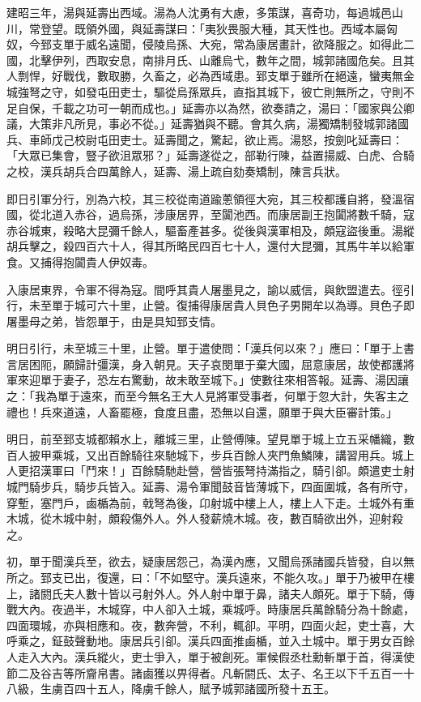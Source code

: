 \begin{pinyinscope}
建昭三年，湯與延壽出西域。湯為人沈勇有大慮，多策謀，喜奇功，每過城邑山川，常登望。既領外國，與延壽謀曰：「夷狄畏服大種，其天性也。西域本屬匈奴，今郅支單于威名遠聞，侵陵烏孫、大宛，常為康居畫計，欲降服之。如得此二國，北擊伊列，西取安息，南排月氏、山離烏弋，數年之間，城郭諸國危矣。且其人剽悍，好戰伐，數取勝，久畜之，必為西域患。郅支單于雖所在絕遠，蠻夷無金城強弩之守，如發屯田吏士，驅從烏孫眾兵，直指其城下，彼亡則無所之，守則不足自保，千載之功可一朝而成也。」延壽亦以為然，欲奏請之，湯曰：「國家與公卿議，大策非凡所見，事必不從。」延壽猶與不聽。會其久病，湯獨矯制發城郭諸國兵、車師戊己校尉屯田吏士。延壽聞之，驚起，欲止焉。湯怒，按劍叱延壽曰：「大眾已集會，豎子欲沮眾邪？」延壽遂從之，部勒行陳，益置揚威、白虎、合騎之校，漢兵胡兵合四萬餘人，延壽、湯上疏自劾奏矯制，陳言兵狀。

即日引軍分行，別為六校，其三校從南道踰蔥領徑大宛，其三校都護自將，發溫宿國，從北道入赤谷，過烏孫，涉康居界，至闐池西。而康居副王抱闐將數千騎，寇赤谷城東，殺略大昆彌千餘人，驅畜產甚多。從後與漢軍相及，頗寇盜後重。湯縱胡兵擊之，殺四百六十人，得其所略民四百七十人，還付大昆彌，其馬牛羊以給軍食。又捕得抱闐貴人伊奴毒。

入康居東界，令軍不得為寇。間呼其貴人屠墨見之，諭以威信，與飲盟遣去。徑引行，未至單于城可六十里，止營。復捕得康居貴人貝色子男開牟以為導。貝色子即屠墨母之弟，皆怨單于，由是具知郅支情。

明日引行，未至城三十里，止營。單于遣使問：「漢兵何以來？」應曰：「單于上書言居困阨，願歸計彊漢，身入朝見。天子哀閔單于棄大國，屈意康居，故使都護將軍來迎單于妻子，恐左右驚動，故未敢至城下。」使數往來相答報。延壽、湯因讓之：「我為單于遠來，而至今無名王大人見將軍受事者，何單于忽大計，失客主之禮也！兵來道遠，人畜罷極，食度且盡，恐無以自還，願單于與大臣審計策。」

明日，前至郅支城都賴水上，離城三里，止營傅陳。望見單于城上立五采幡織，數百人披甲乘城，又出百餘騎往來馳城下，步兵百餘人夾門魚鱗陳，講習用兵。城上人更招漢軍曰「鬥來！」百餘騎馳赴營，營皆張弩持滿指之，騎引卻。頗遣吏士射城門騎步兵，騎步兵皆入。延壽、湯令軍聞鼓音皆薄城下，四面圍城，各有所守，穿塹，塞門戶，鹵楯為前，戟弩為後，卬射城中樓上人，樓上人下走。土城外有重木城，從木城中射，頗殺傷外人。外人發薪燒木城。夜，數百騎欲出外，迎射殺之。

初，單于聞漢兵至，欲去，疑康居怨己，為漢內應，又聞烏孫諸國兵皆發，自以無所之。郅支已出，復還，曰：「不如堅守。漢兵遠來，不能久攻。」單于乃被甲在樓上，諸閼氏夫人數十皆以弓射外人。外人射中單于鼻，諸夫人頗死。單于下騎，傳戰大內。夜過半，木城穿，中人卻入土城，乘城呼。時康居兵萬餘騎分為十餘處，四面環城，亦與相應和。夜，數奔營，不利，輒卻。平明，四面火起，吏士喜，大呼乘之，鉦鼓聲動地。康居兵引卻。漢兵四面推鹵楯，並入土城中。單于男女百餘人走入大內。漢兵縱火，吏士爭入，單于被創死。軍候假丞杜勳斬單于首，得漢使節二及谷吉等所齎帛書。諸鹵獲以畀得者。凡斬閼氏、太子、名王以下千五百一十八級，生虜百四十五人，降虜千餘人，賦予城郭諸國所發十五王。


\end{pinyinscope}
